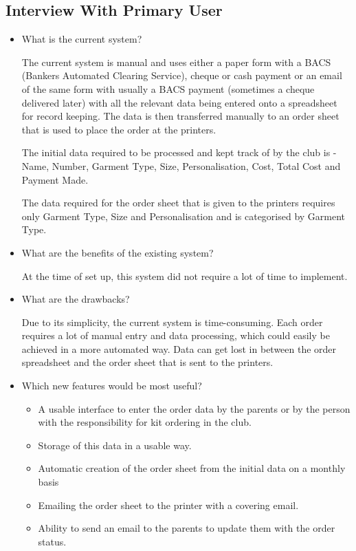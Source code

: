 \documentclass[
11pt, %
a4paper, %
oneside, %
headinclude,footinclude, %
BCOR5mm, %
]{scrartcl}
\begin{document}
\subsection{Interview With Primary User}
\begin{itemize}
\item What is the current system?\par

The current system is manual and uses either a paper form with a BACS (Bankers Automated Clearing Service), cheque or cash payment or an email of the same form with usually a BACS payment (sometimes a cheque delivered later) with all the relevant data being entered onto a spreadsheet for record keeping.
The data is then transferred manually to an order sheet that is used to place the order at the printers. 

The initial data required to be processed and kept track of by the club is -  Name, Number, Garment Type, Size, Personalisation, Cost, Total Cost and Payment Made.

The data required for the order sheet that is given to the printers requires only Garment Type, Size and Personalisation and is categorised by Garment Type.

\item What are the benefits of the existing system?\par
At the time of set up, this system did not require a lot of time to implement.

\item What are the drawbacks?\par
Due to its simplicity, the current system is time-consuming. Each order requires a lot of manual entry and data processing, which could easily be achieved in a more automated way. Data can get lost in between the order spreadsheet and the order sheet that is sent to the printers.

\item Which new features would be most useful?\par
\begin{itemize}

	\item A usable interface to enter the order data by the parents or by the person with the responsibility for kit ordering in the club.
	\item Storage of this data in a usable way.
	\item Automatic creation of the order sheet from the initial data on a monthly basis
	\item Emailing the order sheet to the printer with a covering email.
	\item Ability to send an email to the parents to update them with the order status.
	\end{itemize}


\end{itemize}
\end{document}
